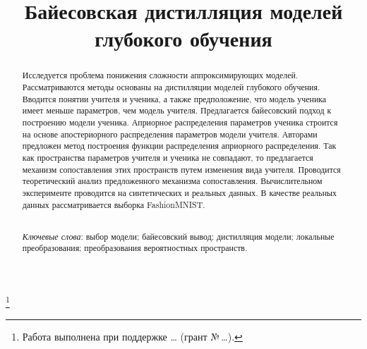 \documentclass[12pt]{a&t}
\begin{document}


\title{Байесовская дистилляция моделей глубокого обучения}%
\thanks{Работа выполнена при поддержке \dots
(грант \mbox{№\,\dots}).}


\maketitle

\begin{abstract}
Исследуется проблема понижения сложности аппроксимирующих моделей. 
Рассматриваются методы основаны на дистилляции моделей глубокого обучения. 
Вводится понятии учителя и ученика, а также предположение, что модель ученика имеет меньше параметров, чем модель учителя. 
Предлагается байесовский подход к построению модели ученика. 
Априорное распределения параметров ученика строится на основе апостериорного распределения параметров модели учителя. 
Авторами предложен метод построения функции распределения априорного распределения.
Так как пространства параметров учителя и ученика не совпадают, то предлагается механизм сопоставления этих пространств путем изменения вида учителя.
Проводится теоретический анализ предложенного механизма сопоставления. Вычислительном эксперименте проводится на синтетических и реальных данных. В качестве реальных данных рассматривается выборка FashionMNIST.

\smallskip\\
\textit{Ключевые слова}: выбор модели; байесовский вывод; дистилляция модели; локальные преобразования; преобразования вероятностных пространств.
\end{abstract}
\end{document}

